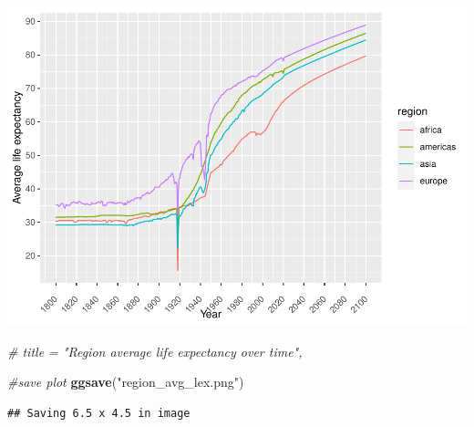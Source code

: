 \documentclass[
]{article}
\newenvironment{Shaded}{\begin{snugshade}}{\end{snugshade}}
\newcommand{\CommentTok}[1]{\textcolor[rgb]{0.56,0.35,0.01}{\textit{#1}}}
\newcommand{\FunctionTok}[1]{\textcolor[rgb]{0.13,0.29,0.53}{\textbf{#1}}}
\newcommand{\NormalTok}[1]{#1}
\newcommand{\StringTok}[1]{\textcolor[rgb]{0.31,0.60,0.02}{#1}}
\begin{document}
\includegraphics{MTSTIN007_SC_Assingment_2_files/figure-latex/unnamed-chunk-8-1.pdf}

\begin{Shaded}
\begin{Highlighting}[]
\CommentTok{\# title = "Region average life expectancy over time",}

\CommentTok{\#save plot}
\FunctionTok{ggsave}\NormalTok{(}\StringTok{"region\_avg\_lex.png"}\NormalTok{)}
\end{Highlighting}
\end{Shaded}

\begin{verbatim}
## Saving 6.5 x 4.5 in image
\end{verbatim}
\end{document}

